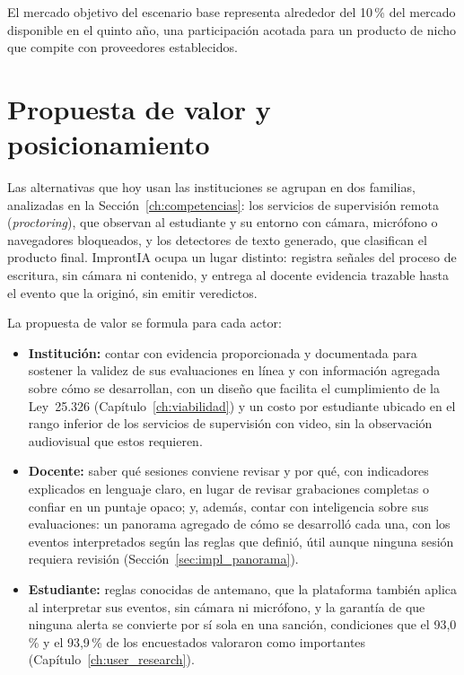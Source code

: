 El mercado objetivo del escenario base representa alrededor del 10\,\% del mercado disponible en el quinto año, una participación acotada para un producto de nicho que compite con proveedores establecidos.

\section{Propuesta de valor y posicionamiento}
\label{sec:neg_propuesta}

Las alternativas que hoy usan las instituciones se agrupan en dos familias, analizadas en la Sección~\ref{ch:competencias}: los servicios de supervisión remota (\textit{proctoring}), que observan al estudiante y su entorno con cámara, micrófono o navegadores bloqueados, y los detectores de texto generado, que clasifican el producto final. ImprontIA ocupa un lugar distinto: registra señales del proceso de escritura, sin cámara ni contenido, y entrega al docente evidencia trazable hasta el evento que la originó, sin emitir veredictos.

La propuesta de valor se formula para cada actor:

\begin{itemize}
    \item \textbf{Institución:} contar con evidencia proporcionada y documentada para sostener la validez de sus evaluaciones en línea y con información agregada sobre cómo se desarrollan, con un diseño que facilita el cumplimiento de la Ley~25.326 (Capítulo~\ref{ch:viabilidad}) y un costo por estudiante ubicado en el rango inferior de los servicios de supervisión con video, sin la observación audiovisual que estos requieren.
    \item \textbf{Docente:} saber qué sesiones conviene revisar y por qué, con indicadores explicados en lenguaje claro, en lugar de revisar grabaciones completas o confiar en un puntaje opaco; y, además, contar con inteligencia sobre sus evaluaciones: un panorama agregado de cómo se desarrolló cada una, con los eventos interpretados según las reglas que definió, útil aunque ninguna sesión requiera revisión (Sección~\ref{sec:impl_panorama}).
    \item \textbf{Estudiante:} reglas conocidas de antemano, que la plataforma también aplica al interpretar sus eventos, sin cámara ni micrófono, y la garantía de que ninguna alerta se convierte por sí sola en una sanción, condiciones que el 93,0\,\% y el 93,9\,\% de los encuestados valoraron como importantes (Capítulo~\ref{ch:user_research}).
\end{itemize}

